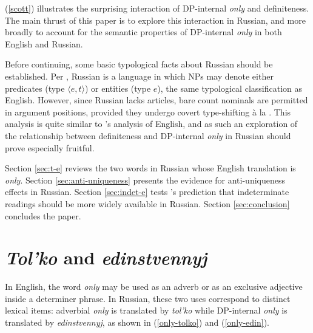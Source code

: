 \documentclass{article}
\begin{document}
(\ref{scott}) illustrates the surprising interaction of DP-internal \textit{only} and definiteness. The main thrust of this paper is to explore this interaction in Russian, and more broadly to account for the semantic properties of DP-internal \textit{only} in both English and Russian.

Before continuing, some basic typological facts about Russian should be established. Per \citet{chierchia98}, Russian is a language in which NPs may denote either predicates (type $\langle e, t \rangle$) or entities (type $e$), the same typological classification as English. However, since Russian lacks articles, bare count nominals are permitted in argument positions, provided they undergo covert type-shifting \`{a} la \citet{partee86}. This analysis is quite similar to \citeauthor{cb2015}'s analysis of English, and as such an exploration of the relationship between definiteness and DP-internal \textit{only} in Russian should prove especially fruitful.


Section \ref{sec:t-e} reviews the two words in Russian whose English translation is \textit{only}. Section \ref{sec:anti-uniqueness} presents the evidence for anti-uniqueness effects in Russian. Section \ref{sec:indet-e} tests \citeauthor{cb2015}'s prediction that indeterminate readings should be more widely available in Russian. Section \ref{sec:conclusion} concludes the paper.



\section{\textit{Tol'ko} and \textit{edinstvennyj} \label{sec:t-e}}
In English, the word \textit{only} may be used as an adverb or as an exclusive adjective inside a determiner phrase. In Russian, these two uses correspond to distinct lexical items: adverbial \textit{only} is translated by \textit{tol'ko} while DP-internal \textit{only} is translated by \textit{edinstvennyj}, as shown in (\ref{only-tolko}) and (\ref{only-edin}).
\end{document}
